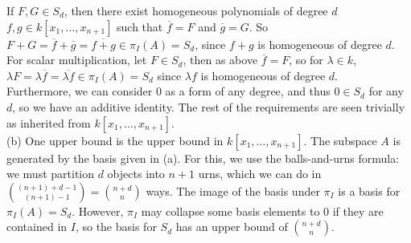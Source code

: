 \documentclass[a4paper]{article}
\begin{document}
If  $F,G \in S_d$, then there exist
homogeneous polynomials of degree $d$ 
 $f,g \in k\left[ x_1, \ldots, x_{n+1} \right] $ such that
 $\overline{f} = F$ and $\overline{g}=G$. So
 $F+G = \overline{f} + \overline{g} = \overline{f+g}
 \in \pi_I(A) = S_d$, since
 $f+g$ is homogeneous of degree $d$.\\
 For scalar multiplication, let $F \in S_d$, then
 as above $\overline{f} = F$, so
 for  $\lambda \in k$, $\lambda F = \lambda \overline{f}
 = \overline{\lambda f} \in \pi_I (A) = S_d$ since
 $\lambda f$ is homogeneous of degree $d$.\\
 Furthermore, we can consider $0$ as a form of any degree, and thus
 $0 \in S_d$ for any $d$, so we have an additive identity. The
 rest of the requirements are seen trivially as inherited from
 $k\left[ x_1, \ldots, x_{n+1} \right] $.\\
 \linebreak
 (b) One upper bound is the upper bound in
 $k\left[ x_1, \ldots, x_{n+1} \right] $. The subspace
 $A$ is generated by the basis given in (a). For this, we use the
 balls-and-urns formula: we must partition $d$ objects into
 $n+1$ urns, which we can do in
 $\binom{(n+1)+d-1}{(n+1)-1} = \binom{n+d}{n}$ ways. The image of the basis
 under
 $\pi_I$ is a basis for $\pi_I (A) = S_d$. However, $\pi_I$ may collapse some
 basis elements to $0$ if they are contained in $I$, so the basis for
 $S_d$ has an upper bound of
 $\binom{n+d}{n}$.
\end{document}

